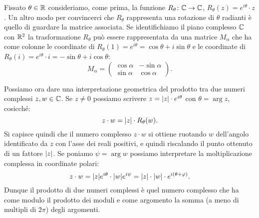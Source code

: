 \begin{remark}
Fissato $\theta\in \mathbb R$
consideriamo, come prima, la funzione $R_\theta\colon \mathbb C \to \mathbb C$,
$R_\theta(z) = e^{i\theta}\cdot z$.
Un altro modo per convincerci che $R_\theta$
rappresenta una rotazione di $\theta$ radianti è
quello di guardare la matrice associata.
Se identifichiamo il piano complesso $\mathbb C$ con $\mathbb R^2$ la trasformazione
$R_\theta$ può essere rappresentata
da una matrice $M_\alpha$ che ha come
colonne le coordinate di $R_\theta(1) = e^{i\theta} = \cos \theta + i \sin \theta$
e le coordinate di $R_\theta(i) = e^{i\theta}\cdot i = -\sin \theta + i \cos \theta$:
\[
  M_\alpha =
  \begin{pmatrix}
  \cos \alpha & -\sin \alpha \\
  \sin \alpha & \cos \alpha
  \end{pmatrix}.
\]
\end{remark}

\begin{remark}
Possiamo ora dare una interpretazione geometrica del prodotto tra
due numeri complessi $z,w\in \mathbb C$.
Se $z\neq 0$ possiamo scrivere $z = {\left|z\right|} \cdot e^{i\theta}$
con $\theta= \arg z$, cosicché:
\[
  z \cdot w = {\left|z\right|} \cdot R_\theta(w).
\]
Si capisce quindi che il numero complesso $z\cdot w$ si ottiene ruotando
$w$ dell'angolo identificato da $z$ con l'asse dei reali positivi, e quindi
riscalando il punto ottenuto di un fattore ${\left|z\right|}$.
Se poniamo $\psi = \arg w$ possiamo interpretare la moltiplicazione complessa
in coordinate polari:
\[
  z \cdot w = {\left|z\right|}e^{i\theta}\cdot {\left|w\right|} e^{i\psi}
   = {\left|z\right|} \cdot {\left|w\right|} \cdot e^{i(\theta + \varphi)}.
\]
Dunque il prodotto di due numeri complessi è quel numero complesso
che ha come modulo il prodotto dei moduli e come argomento
la somma (a meno di multipli di $2\pi$) degli argomenti.
\end{remark}


